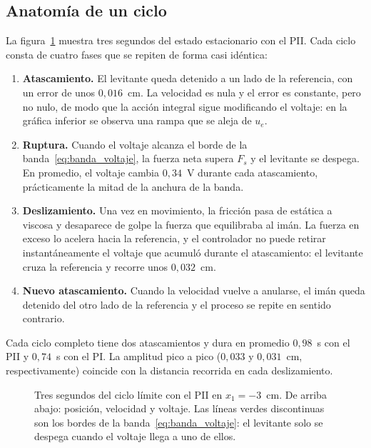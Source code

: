 \subsection{Anatomía de un ciclo}

La figura~\ref{fig:anatomia} muestra tres segundos del estado estacionario con el PII. Cada ciclo consta de cuatro fases que se repiten de forma casi idéntica:

\begin{enumerate}
  \item \textbf{Atascamiento.} El levitante queda detenido a un lado de la referencia, con un error de unos $0{,}016$~cm. La velocidad es nula y el error es constante, pero no nulo, de modo que la acción integral sigue modificando el voltaje: en la gráfica inferior se observa una rampa que se aleja de $u_e$.
  \item \textbf{Ruptura.} Cuando el voltaje alcanza el borde de la banda~\eqref{eq:banda_voltaje}, la fuerza neta supera $F_s$ y el levitante se despega. En promedio, el voltaje cambia $0{,}34$~V durante cada atascamiento, prácticamente la mitad de la anchura de la banda.
  \item \textbf{Deslizamiento.} Una vez en movimiento, la fricción pasa de estática a viscosa y desaparece de golpe la fuerza que equilibraba al imán. La fuerza en exceso lo acelera hacia la referencia, y el controlador no puede retirar instantáneamente el voltaje que acumuló durante el atascamiento: el levitante cruza la referencia y recorre unos $0{,}032$~cm.
  \item \textbf{Nuevo atascamiento.} Cuando la velocidad vuelve a anularse, el imán queda detenido del otro lado de la referencia y el proceso se repite en sentido contrario.
\end{enumerate}

Cada ciclo completo tiene dos atascamientos y dura en promedio $0{,}98$~s con el PII y $0{,}74$~s con el PI. La amplitud pico a pico ($0{,}033$ y $0{,}031$~cm, respectivamente) coincide con la distancia recorrida en cada deslizamiento.

\begin{figure}[ht]
    \centering
    
    \caption[Anatomía del ciclo límite]{Tres segundos del ciclo límite con el PII en $x_1=-3$~cm. De arriba abajo: posición, velocidad y voltaje. Las líneas verdes discontinuas son los bordes de la banda~\eqref{eq:banda_voltaje}: el levitante solo se despega cuando el voltaje llega a uno de ellos.}
    \label{fig:anatomia}
\end{figure}

